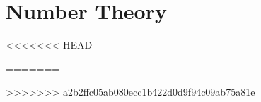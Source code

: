 \part{Number Theory}










<<<<<<< HEAD

=======

>>>>>>> a2b2ffc05ab080ecc1b422d0d9f94c09ab75a81e


